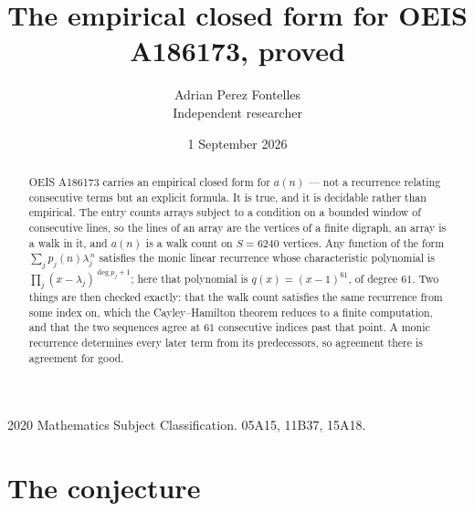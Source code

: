 \documentclass[11pt,a4paper]{article}
\title{The empirical closed form for OEIS A186173, proved}
\author{Adrian Perez Fontelles\\ \small Independent researcher}
\date{1 September 2026}
\theoremstyle{plain}
\theoremstyle{definition}
\begin{document}
\maketitle

\begin{abstract}
OEIS A186173 carries an empirical closed form for $a(n)$ --- not a recurrence relating
consecutive terms but an explicit formula. It is true, and it is decidable rather than
empirical. The entry counts arrays subject to a condition on a bounded window of consecutive lines, so the lines of an array are the
vertices of a finite digraph, an array is a walk in it, and $a(n)$ is a walk count on
$S=6240$ vertices. Any function of the form $\sum_j p_j(n)\lambda_j^{\,n}$ satisfies the
monic linear recurrence whose characteristic polynomial is
$\prod_j(x-\lambda_j)^{\deg p_j+1}$; here that polynomial is $q(x)=(x-1)^{61}$, of degree
$61$. Two things are then checked exactly: that the walk count satisfies the same
recurrence from some index on, which the Cayley--Hamilton theorem reduces to a finite
computation, and that the two sequences agree at $61$ consecutive indices past that
point. A monic recurrence determines every later term from its predecessors, so agreement
there is agreement for good.
\end{abstract}

\noindent\small 2020 Mathematics Subject Classification. 05A15, 11B37, 15A18.\normalsize

\section{The conjecture}
\end{document}
